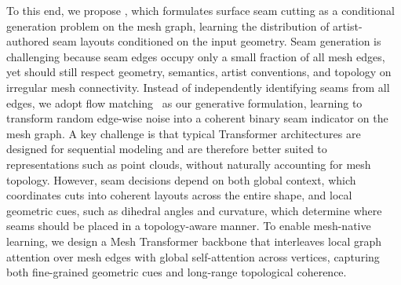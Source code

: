  

To this end, we propose \textit{\methodname{}}, which formulates surface seam cutting as a conditional generation problem on the mesh graph, learning the distribution of artist-authored seam layouts conditioned on the input geometry.
Seam generation is challenging because seam edges occupy only a small fraction of all mesh edges, yet should still respect geometry, semantics, artist conventions, and topology on irregular mesh connectivity.  
Instead of independently identifying seams from all edges, we adopt flow matching~\cite{lipman2023flow} as our generative formulation, learning to transform random edge-wise noise into a coherent binary seam indicator on the mesh graph.
A key challenge is that typical Transformer architectures are designed for sequential modeling and are therefore better suited to representations such as point clouds, without naturally accounting for mesh topology. However, seam decisions depend on both global context, which coordinates cuts into coherent layouts across the entire shape, and local geometric cues, such as dihedral angles and curvature, which determine where seams should be placed in a topology-aware manner.
%
To enable mesh-native learning, we design a Mesh Transformer backbone that interleaves local graph attention over mesh edges with global self-attention across vertices, capturing both fine-grained geometric cues and long-range topological coherence.
% 
